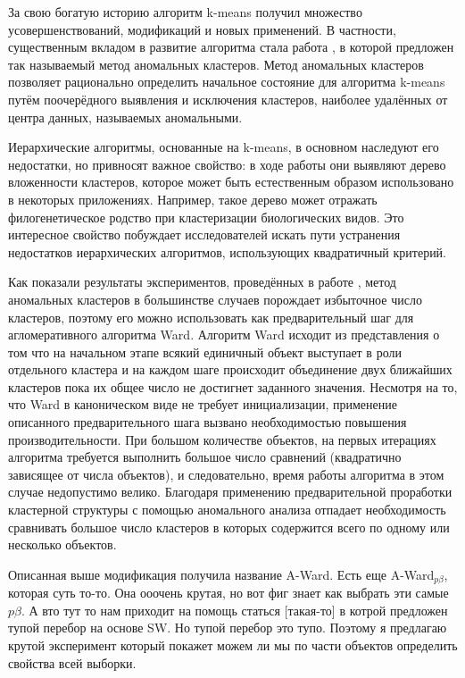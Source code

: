 \documentclass[12pt]{a&t}
\begin{document}
За свою богатую историю алгоритм \mbox{k-means} получил множество усовершенствований, модификаций и новых применений. В частности, существенным вкладом в развитие алгоритма стала работа \cite{Anomalous-Clustring}, в которой предложен так называемый метод аномальных кластеров. Метод аномальных кластеров позволяет рационально определить начальное состояние для алгоритма \mbox{k-means} путём поочерёдного выявления и исключения кластеров, наиболее удалённых от центра данных, называемых аномальными. 

Иерархические алгоритмы, основанные на \mbox{k-means}, в основном наследуют его недостатки, но привносят важное свойство: в ходе работы они выявляют дерево вложенности кластеров, которое может быть естественным образом использовано в некоторых приложениях. Например, такое дерево может отражать  филогенетическое родство при кластеризации биологических видов. Это интересное свойство побуждает исследователей искать пути устранения недостатков иерархических алгоритмов, использующих квадратичный критерий. 

Как показали результаты экспериментов, проведённых в работе \cite{None}, метод аномальных кластеров в большинстве случаев порождает избыточное число кластеров, поэтому его можно использовать как предварительный шаг для агломеративного алгоритма Ward. Алгоритм Ward исходит из представления о том что на начальном этапе всякий единичный объект выступает в роли отдельного кластера и на каждом шаге происходит объединение двух ближайших кластеров пока их общее число не достигнет заданного значения.  Несмотря на то, что Ward в каноническом виде не требует инициализации, применение описанного предварительного шага вызвано необходимостью повышения производительности. При большом количестве объектов, на первых итерациях алгоритма требуется выполнить большое число сравнений (квадратично зависящее от числа объектов), и следовательно, время работы алгоритма в этом случае недопустимо велико. Благодаря применению предварительной проработки кластерной структуры с помощью аномального анализа отпадает необходимость сравнивать большое число кластеров в которых содержится всего по одному или несколько объектов. 

Описанная выше модификация получила название \mbox{A-Ward}. Есть еще \mbox{A-Ward$ _{p\beta} $}, которая суть то-то. Она ооочень крутая, но вот фиг знает как выбрать эти самые $ p\beta $. А вто тут то нам приходит на помощь статься [такая-то] в котрой предложен тупой перебор на основе SW. Но тупой перебор это тупо. Поэтому я предлагаю крутой эксперимент который покажет можем ли мы по части объектов определить свойства всей выборки. 
\end{document}
